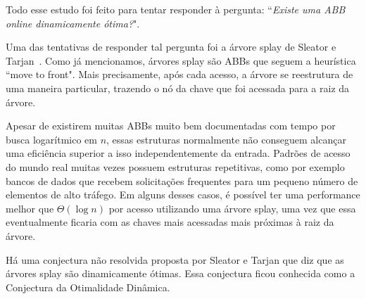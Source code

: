 Todo esse estudo foi feito para tentar responder à pergunta: ``\textit{Existe uma ABB online dinamicamente ótima?}".

Uma das tentativas de responder tal pergunta foi a árvore splay de Sleator e Tarjan~\cite{selfadjustingbst}. Como já mencionamos, árvores splay são ABBs que seguem a heurística ``move to front". Mais precisamente, após cada acesso, a árvore se reestrutura de uma maneira particular, trazendo o nó da chave que foi acessada para a raiz da árvore.

Apesar de existirem muitas ABBs muito bem documentadas com tempo por busca logarítmico em $n$, essas estruturas normalmente não conseguem alcançar uma eficiência superior a isso independentemente da entrada. Padrões de acesso do mundo real muitas vezes possuem estruturas repetitivas, como por exemplo bancos de dados que recebem solicitações frequentes para um pequeno número de elementos de alto tráfego. Em alguns desses casos, é possível ter uma performance melhor que $\Theta(\log n)$ por acesso utilizando uma árvore splay, uma vez que essa eventualmente ficaria com as chaves mais acessadas mais próximas à raiz da árvore. 

Há uma conjectura não resolvida proposta por Sleator e Tarjan \cite{selfadjustingbst} que diz que as árvores splay são dinamicamente ótimas. Essa conjectura ficou conhecida como a Conjectura da Otimalidade Dinâmica.





